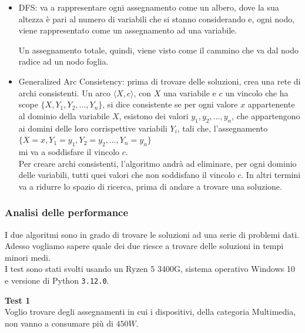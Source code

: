 \documentclass[12pt, letterpaper]{article}
\begin{document}
\begin{itemize}
      \item DFS: va a rappresentare ogni assegnamento come un albero, dove la sua altezza è
            pari al numero di variabili che si stanno considerando e, ogni nodo, viene
            rappresentato come un assegnamento ad una variabile.

            Un assegnamento totale, quindi, viene visto come il cammino che va dal nodo radice ad
            un nodo foglia.

      \item Generalized Arc Consistency: prima di trovare delle soluzioni, crea una rete di archi consistenti.
            Un arco $\langle X, c \rangle$, con $X$ una variabile e $c$ un vincolo che ha
            scope $\{X, Y_1, Y_2, \dots, Y_n\}$, si dice consistente se per ogni valore $x$ appartenente al dominio
            della variabile $X$, esistono dei valori $y_1, y_2, \dots, y_n$, che appartengono ai domini delle loro
            corrispettive variabili $Y_i$, tali che, l'assegnamento $\{X=x, Y_1=y_1, Y_2=y_2, \dots, Y_n=y_n\}$ \\
            mi va a soddisfare il vincolo $c$. \\

            Per creare archi consistenti, l'algoritmo andrà ad eliminare, per ogni dominio delle variabili, tutti
            quei valori che non soddisfano il vincolo $c$. In altri termini va a ridurre lo spazio di ricerca, prima di
            andare a trovare una soluzione. \\
\end{itemize}




\subsubsection{Analisi delle performance}

I due algoritmi sono in grado di trovare le soluzioni ad una serie di problemi dati. Adesso vogliamo sapere quale
dei due riesce a trovare delle soluzioni in tempi minori medi. \\

\noindent I test sono stati svolti usando un Ryzen 5 3400G, sistema operativo Windows 10 e
versione di Python \texttt{3.12.0}. \pagebreak


\noindent \textbf{Test 1} \\

\noindent Voglio trovare degli assegnamenti in cui i dispositivi, della
categoria Multimedia, non vanno a consumare più di $450W$. \\
\end{document}
